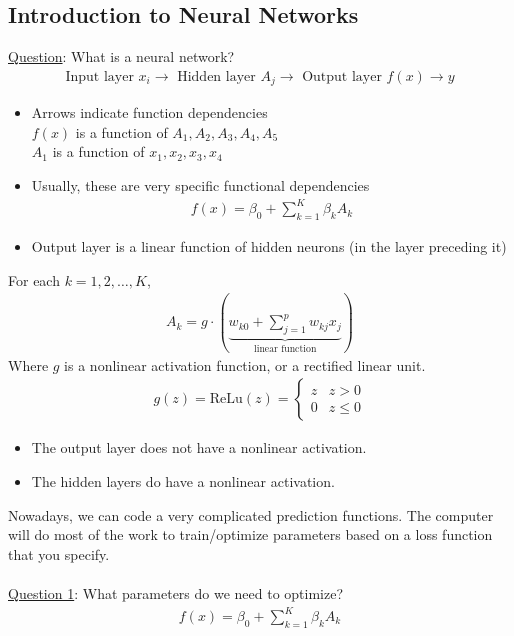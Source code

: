 \documentclass[12pt, letterpaper]{article}
\begin{document}
\subsection{Introduction to Neural Networks}
\underline{Question}: What is a neural network? 
\begin{align*}
    \text{Input layer } x_i \rightarrow \text{ Hidden layer } A_j \rightarrow \text{ Output layer } f(x) \rightarrow y
\end{align*}
\begin{itemize}
    \item Arrows indicate function dependencies \\
        $f(x)$ is a function of $A_1,A_2,A_3,A_4,A_5$ \\
        $A_1$ is a function of $x_1,x_2,x_3,x_4$
    \item Usually, these are very specific functional dependencies
    \begin{align*}
        f(x) = \beta_0 + \sum_{k=1}^{K}\beta_kA_k
    \end{align*}
    \item Output layer is a linear function of hidden neurons (in the layer
    preceding it)
\end{itemize}
For each $k = 1,2,\dots,K$,
\begin{align*}
    A_k = g \cdot \left(\underbrace{w_{k0} + \sum_{j=1}^{p}w_{kj}x_j}_{\text{linear function}}\right)
\end{align*}
Where $g$ is a nonlinear activation function, or a rectified linear unit.
\begin{align*}
    g(z) = \text{ReLu}(z) = \begin{cases}
        z & z > 0 \\ 0 & z \le 0
    \end{cases}
\end{align*}
\begin{itemize}
    \item The output layer does not have a nonlinear activation.
    \item The hidden layers do have a nonlinear activation.
\end{itemize}
Nowadays, we can code a very complicated prediction functions. The computer will
do most of the work to train/optimize parameters based on a loss function that 
you specify. \\ \\
\underline{Question 1}: What parameters do we need to optimize? 
\begin{align*}
    f(x) = \beta_0 + \sum_{k=1}^{K}\beta_kA_k
\end{align*}
\end{document}
